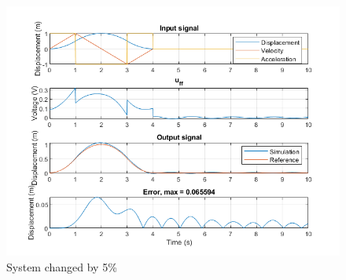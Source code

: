 \documentclass[12pt]{article}
\begin{document}
\begin{enumerate}[(a)]
    \begin{figure}[h]
      \includegraphics[width=15cm]{result_f_2}
      \caption{System changed by 5\%}
      \centering
    \end{figure}



  \end{enumerate}
\end{document}
